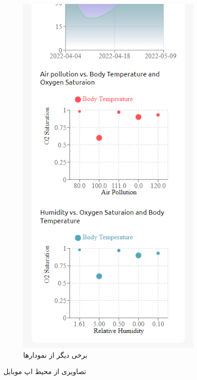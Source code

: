 \begin{figure}[H]
\begin{center}
		\begin{subfigure}{.24\textwidth}
			\includegraphics[width=.95\linewidth]{figs/app_charts2}
			\caption{برخی دیگر از نمودارها}
			\label{initial_charts2}
		\end{subfigure}
		\caption{تصاویری از محیط اپ موبایل}
		\label{app_screenshots}
	\end{center}
\end{figure}

